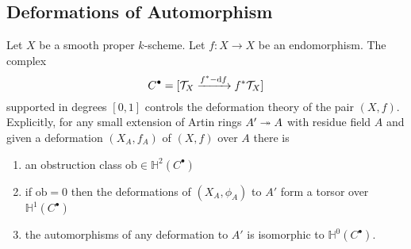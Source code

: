 \documentclass[12pt]{article}
\newcommand{\HH}{\mathbb{H}}
\newcommand{\ob}{\mathrm{ob}}
\begin{document}
\subsection{Deformations of Automorphism}

\begin{lemma}
Let $X$ be a smooth proper $k$-scheme. Let $f : X \to X$ be an endomorphism. The complex
\[ C^\bullet = [\mathcal{T}_X \xrightarrow{f^* - \mathrm{d}{f}} f^* \mathcal{T}_X] \]
supported in degrees $[0,1]$ controls the deformation theory of the pair $(X, f)$. Explicitly, for any small extension of Artin rings $A' \twoheadrightarrow A$ with residue field $A$ and given a deformation $(X_A, f_A)$ of $(X, f)$ over $A$ there is
\begin{enumerate}
\item an obstruction class $\ob \in \HH^2(C^\bullet)$
\item if $\ob = 0$ then the deformations of $(X_A, \phi_A)$ to $A'$ form a torsor over $\HH^1(C^\bullet)$
\item the automorphisms of any deformation to $A'$ is isomorphic to $\HH^0(C^\bullet)$.
\end{enumerate}
\end{lemma}
\end{document}
